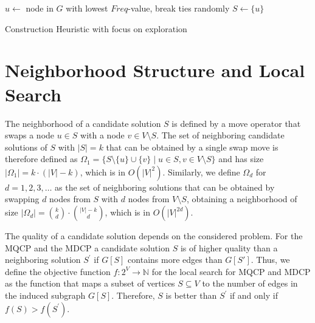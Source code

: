 \documentclass[draft,final]{vutinfth} %
\begin{document}
\begin{algorithm}
    \DontPrintSemicolon
    $u \gets $ node in $G$ with lowest $Freq$-value, break ties randomly \;
    $S \gets \{u\}$ \;
    \label{alg:exploration-construction-while-end}
    \caption{Construction Heuristic with focus on exploration}
    \label{alg:exploration-construction}
\end{algorithm}

\section{Neighborhood Structure and Local Search} \label{sec:neighborhood-structure}

The neighborhood of a candidate solution $S$ is defined by a move operator that swaps a node $u \in S$ with a node $v \in V \setminus S$. The set of neighboring candidate solutions of $S$ with $|S| = k$ that can be obtained by a single swap move is therefore defined as $\Omega_1 = \{ S \setminus \{u\} \cup \{v\} \mid u \in S, v \in V \setminus S \}$ and has size $|\Omega_1| = k \cdot (|V|-k)$, which is in $O(|V|^2)$. Similarly, we define $\Omega_d$ for $d=1,2,3,\dots$ as the set of neighboring solutions that can be obtained by swapping $d$ nodes from $S$ with $d$ nodes from $V \setminus S$, obtaining a neighborhood of size $|\Omega_d| = \binom{k}{d} \cdot \binom{|V|-k}{d}$, which is in $O(|V|^{2d})$. 


The quality of a candidate solution depends on the considered problem. For the MQCP and the MDCP a candidate solution $S$ is of higher quality than a neighboring solution $S^\prime$ if $G[S]$ contains more edges than $G[S']$. Thus, we define the objective function $f \colon 2^V \rightarrow \mathbb{N}$ for the local search for MQCP and MDCP as the function that maps a subset of vertices $S \subseteq V$ to the number of edges in the induced subgraph $G[S]$. Therefore, $S$ is better than $S^\prime$ if and only if $f(S) > f(S^\prime)$. 
\end{document}
